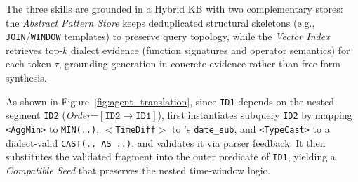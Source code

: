 \documentclass[conference]{IEEEtran}
\begin{document}
The three skills are grounded in a Hybrid KB with two complementary stores: the \textit{Abstract Pattern Store} keeps deduplicated structural skeletons (e.g., \texttt{JOIN}/\texttt{WINDOW} templates) to preserve query topology, while the \textit{Vector Index} retrieves top-$k$ dialect evidence (function signatures and operator semantics) for each token $\tau$, grounding generation in concrete evidence rather than free-form synthesis.

As shown in Figure~\ref{fig:agent_translation}, since \texttt{ID1} depends on the nested segment \texttt{ID2} (\textit{Order}=$[\mathtt{ID2} \rightarrow \mathtt{ID1}]$), \tool{} first instantiates subquery \texttt{ID2} by mapping \texttt{<AggMin>} to \texttt{MIN(..)}, $<$\texttt{TimeDiff}$>$ to \duckdb{}'s \texttt{date\_sub}, and \texttt{<TypeCast>} to a dialect-valid \texttt{CAST(.. AS ..)}, and validates it via parser feedback. It then substitutes the validated fragment into the outer predicate of \texttt{ID1}, yielding a \textit{Compatible Seed} that preserves the nested time-window logic.
\end{document}
